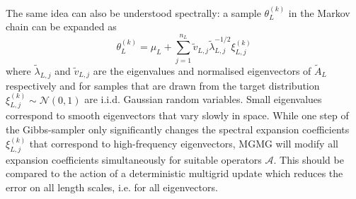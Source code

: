 \documentclass[11pt,english]{article}
\theoremstyle{plain}
\theoremstyle{plain}
\theoremstyle{plain}
\theoremstyle{plain}
\numberwithin{equation}{section}
\newcommand{\rev}[1]{#1}
\begin{document}
\rev{The same idea can also be understood spectrally: a sample $\theta_L^{(k)}$ in the Markov chain can be expanded as
\begin{equation}
    \theta_L^{(k)} = \mu_L + \sum_{j=1}^{n_L} \widetilde{v}_{L,j}\widetilde{\lambda}_{L,j}^{-1/2} \xi_{L,j}^{(k)}
\end{equation}
where $\widetilde{\lambda}_{L,j}$ and $\widetilde{v}_{L,j}$ are the eigenvalues and normalised eigenvectors of $\widetilde{A}_L$ respectively and for samples that are drawn from the target distribution $\xi_{L,j}^{(k)}\sim\mathcal{N}(0,1)$ are i.i.d. Gaussian random variables. Small eigenvalues correspond to smooth eigenvectors that vary slowly in space. While one step of the Gibbs-sampler only significantly changes the spectral expansion coefficients $\xi_{L,j}^{(k)}$ that correspond to high-frequency eigenvectors, MGMG will modify all expansion coefficients simultaneously for suitable operators $\mathcal{A}$. This should be compared to the action of a deterministic multigrid update which reduces the error on all length scales, i.e. for all eigenvectors.
}
\end{document}
